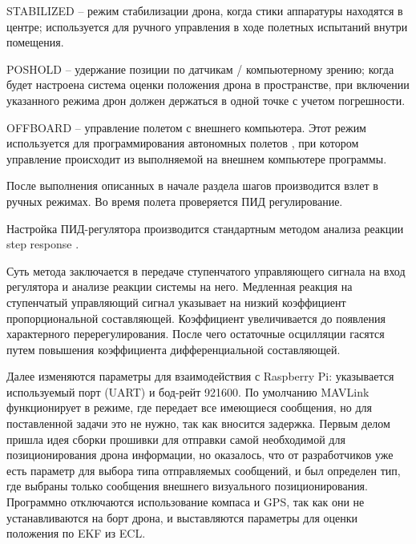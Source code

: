 STABILIZED -- режим стабилизации дрона, когда стики аппаратуры находятся в центре; используется для ручного управления в ходе полетных испытаний внутри помещения.

POSHOLD -- удержание позиции по датчикам / компьютерному зрению; когда будет настроена система оценки положения дрона в пространстве, при включении указанного режима дрон должен держаться в одной точке с учетом погрешности.

OFFBOARD -- управление полетом с внешнего компьютера. Этот режим используется для программирования автономных полетов \cite{clover}, при котором управление происходит из выполняемой на внешнем компьютере программы.

После выполнения описанных в начале раздела шагов производится взлет в ручных режимах. Во время полета проверяется ПИД регулирование.

Настройка ПИД-регулятора производится стандартным методом анализа реакции step res\-ponse \cite{step}.

Суть метода заключается в передаче ступенчатого управляющего сигнала на вход регулятора и анализе реакции системы на него.
Медленная реакция на ступенчатый управляющий сигнал указывает на низкий коэффициент пропорциональной составляющей.
Коэффициент увеличивается до появления характерного перерегулирования.
После чего остаточные осцилляции гасятся путем повышения коэффициента дифференциальной составляющей.

Далее изменяются параметры для взаимодействия с Raspberry Pi: указывается используемый порт (UART) и бод-рейт 921600.
По умолчанию MAV\-Link функционирует в режиме, где передает все имеющиеся сообщения, но для поставленной задачи это не нужно, так как вносится задержка. Первым делом пришла идея сборки прошивки для отправки самой необходимой для позиционирования дрона информации, но оказалось, что от разработчиков уже есть параметр для выбора типа отправляемых сообщений, и был определен тип, где выбраны только сообщения внешнего визуального позиционирования.
Программно отключаются использование компаса и GPS, так как они не устанавливаются на борт дрона, и выставляются параметры для оценки положения по EKF из ECL.

